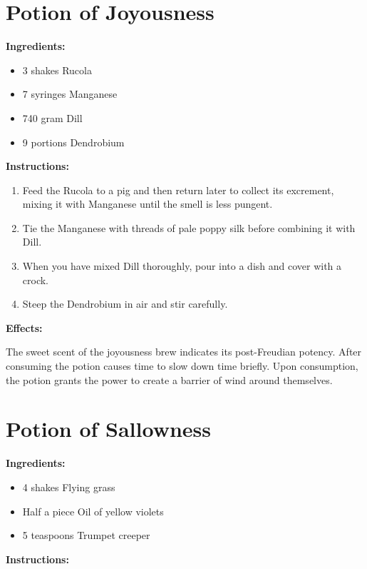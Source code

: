 \documentclass{article}
\begin{document}
\newpage
\section*{Potion of Joyousness}

\textbf{Ingredients:}

\begin{itemize}
  \item 3 shakes Rucola
  \item 7 syringes Manganese
  \item 740 gram Dill
  \item 9 portions Dendrobium
\end{itemize}

\textbf{Instructions:}

\begin{enumerate}
  \item Feed the Rucola to a pig and then return later to collect its excrement, mixing it with Manganese until the smell is less pungent.
  \item Tie the Manganese with threads of pale poppy silk before combining it with Dill.
  \item When you have mixed Dill thoroughly, pour into a dish and cover with a crock.
  \item Steep the Dendrobium in air and stir carefully.
\end{enumerate}

\textbf{Effects:}

The sweet scent of the joyousness brew indicates its post-Freudian potency. After consuming the potion causes time to slow down time briefly. Upon consumption, the potion grants the power to create a barrier of wind around themselves.

\newpage
\section*{Potion of Sallowness}

\textbf{Ingredients:}

\begin{itemize}
  \item 4 shakes Flying grass
  \item Half a piece Oil of yellow violets
  \item 5 teaspoons Trumpet creeper
\end{itemize}

\textbf{Instructions:}
\end{document}
